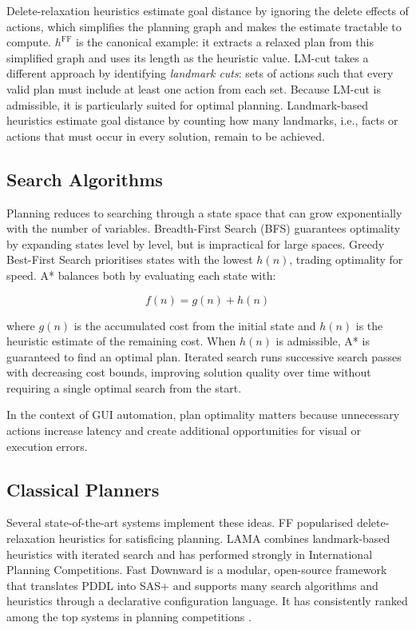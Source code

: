 Delete-relaxation heuristics estimate goal distance by ignoring the delete effects of actions, which simplifies the planning graph and makes the estimate tractable to compute. $h^{\mathrm{FF}}$ \cite{Hoffmann2001} is the canonical example: it extracts a relaxed plan from this simplified graph and uses its length as the heuristic value. LM-cut \cite{Helmert2009} takes a different approach by identifying \textit{landmark cuts}: sets of actions such that every valid plan must include at least one action from each set. Because LM-cut is admissible, it is particularly suited for optimal planning. Landmark-based heuristics \cite{Richter2010} estimate goal distance by counting how many landmarks, i.e., facts or actions that must occur in every solution, remain to be achieved.

\subsection{Search Algorithms}
\label{subsec:planning_search}

Planning reduces to searching through a state space that can grow exponentially with the number of variables. Breadth-First Search (BFS) guarantees optimality by expanding states level by level, but is impractical for large spaces. Greedy Best-First Search prioritises states with the lowest $h(n)$, trading optimality for speed. A* \cite{Hart1968} balances both by evaluating each state with:

\begin{equation}
    f(n) = g(n) + h(n)
\end{equation}

\noindent where $g(n)$ is the accumulated cost from the initial state and $h(n)$ is the heuristic estimate of the remaining cost. When $h(n)$ is admissible, A* is guaranteed to find an optimal plan. Iterated search \cite{Richter2010} runs successive search passes with decreasing cost bounds, improving solution quality over time without requiring a single optimal search from the start.

In the context of GUI automation, plan optimality matters because unnecessary actions increase latency and create additional opportunities for visual or execution errors.

\subsection{Classical Planners}
\label{subsec:planners}

Several state-of-the-art systems implement these ideas. FF \cite{Hoffmann2001} popularised delete-relaxation heuristics for satisficing planning. LAMA \cite{Richter2010} combines landmark-based heuristics with iterated search and has performed strongly in International Planning Competitions. Fast Downward \cite{Helmert2006} is a modular, open-source framework that translates PDDL into SAS+ and supports many search algorithms and heuristics through a declarative configuration language. It has consistently ranked among the top systems in planning competitions \cite{Taitler2024}.

